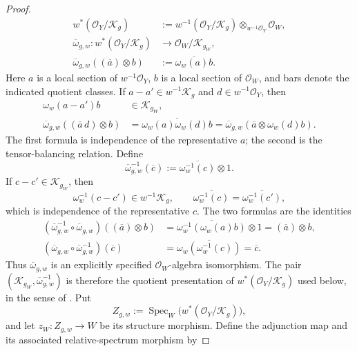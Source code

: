 \begin{proof}
  \[
  \begin{aligned}
    w^*(\mathcal O_Y/\mathcal K_g)
      &:={w^{-1}(\mathcal O_Y/\mathcal K_g)}
          \otimes_{w^{-1}\mathcal O_Y}\mathcal O_W,\\
    \overline\omega_{g,w}\colon
      w^*(\mathcal O_Y/\mathcal K_g)
      &\longrightarrow\mathcal O_W/\mathcal K_{g_W},\\
    \overline\omega_{g,w}((\overline a)\otimes b)
      &:=\overline{\omega_w(a)b}.
  \end{aligned}
  \]
  Here $a$ is a local section of $w^{-1}\mathcal O_Y$, $b$ is a local
  section of $\mathcal O_W$, and bars denote the indicated quotient classes.
  If $a-a'\in w^{-1}\mathcal K_g$ and
  $d\in w^{-1}\mathcal O_Y$, then
  \[
  \begin{aligned}
    \omega_w(a-a')b&\in\mathcal K_{g_W},\\
    \overline\omega_{g,w}((\overline a\,d)\otimes b)
      &=\overline{\omega_w(a)\omega_w(d)b}
       =\overline\omega_{g,w}
          (\overline a\otimes\omega_w(d)b).
  \end{aligned}
  \]
  The first formula is independence of the representative $a$; the second is
  the tensor-balancing relation.  Define
  \[
    \overline\omega_{g,w}^{-1}(\overline c)
      :=\overline{\omega_w^{-1}(c)}\otimes1.
  \]
  If $c-c'\in\mathcal K_{g_W}$, then
  \[
    \omega_w^{-1}(c-c')\in w^{-1}\mathcal K_g,
    \qquad
    \overline{\omega_w^{-1}(c)}
      =\overline{\omega_w^{-1}(c')},
  \]
  which is independence of the representative $c$.
  The two formulas are the identities
  \[
  \begin{aligned}
    (\overline\omega_{g,w}^{-1}\circ
       \overline\omega_{g,w})((\overline a)\otimes b)
      &=\overline{\omega_w^{-1}(\omega_w(a)b)}\otimes1
       =(\overline a)\otimes b,\\
    (\overline\omega_{g,w}\circ
       \overline\omega_{g,w}^{-1})(\overline c)
      &=\overline{\omega_w(\omega_w^{-1}(c))}
       =\overline c.
  \end{aligned}
  \]
  Thus $\overline\omega_{g,w}$ is an explicitly specified
  $\mathcal O_W$-algebra isomorphism.  The pair
  $(\mathcal K_{g_W},\overline\omega_{g,w}^{-1})$ is therefore the quotient
  presentation of $w^*(\mathcal O_Y/\mathcal K_g)$ used below, in the sense
  of .  Put
  \[
    Z_{g,w}:=
      \operatorname{Spec}_W\bigl(w^*(\mathcal O_Y/\mathcal K_g)\bigr),
  \]
  and let $z_W\colon Z_{g,w}\to W$ be its structure morphism.  Define the
  adjunction map and its associated relative-spectrum morphism by

\end{proof}
